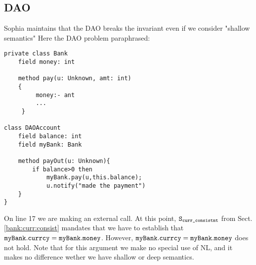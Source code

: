 \subsection{DAO}
\label{s:DAO}

\SP Sophia maintains that the DAO breaks the invariant even if we consider "shallow semantics"
Here the DAO problem paraphrased: 

\begin{lstlisting}[language=chainmail, mathescape=true, frame=lines]
private class Bank
    field money: int
    
    method pay(u: Unknown, amt: int)
    {
         money:- ant
         ...
     }

class DAOAccount
	field balance: int
	field myBank: Bank
	
	method payOut(u: Unknown){
		if balance>0 then
			myBank.pay(u,this.balance);
			u.notify("made the payment")
	}
}
\end{lstlisting}

On line 17 we are making an external call. At this point, $ {\texttt{S}}_{{\texttt{curr\_consistnt}}}$ from Sect. \ref{bank:curr:consist} mandates that we have to establish that ${{\texttt{myBank}}.{\texttt{currcy}}= {\texttt{myBank}}.{\texttt{money}}}$. However, ${{\texttt{myBank}}.{\texttt{currcy}}= {\texttt{myBank}}.{\texttt{money}}}$ does not hold. Note that for this argument we make no special use of NL, and it makes no difference wether we have shallow or deep semantics.
